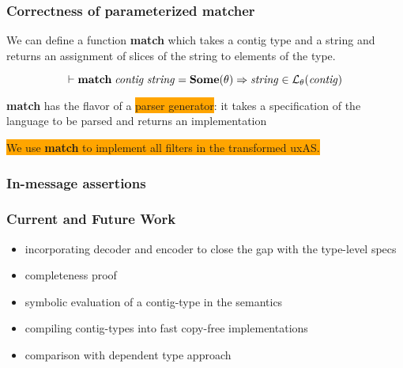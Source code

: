 \documentclass{beamer}
\newcommand{\imp}{\Rightarrow}
\newcommand{\kemph}[1]{\colorbox{orange}{#1}}
\newcommand{\konst}[1]{\ensuremath{\mbox{\bf{#1}}}}
\newcommand{\LangTheta}[1]{\ensuremath{{\mathcal L}_{\theta}({#1})}}
\begin{document}
\begin{frame}[fragile]\frametitle{Correctness of parameterized matcher}

We can define a function \textbf{match} which takes a contig type and
a string and returns an assignment of slices of the string to elements of the type.

\begin{theorem}[Soundness]
  \[
 \vdash \konst{match}\; \mathit{contig}\; \mathit{string} = \konst{Some}(\theta) \imp
   \mathit{string} \in \LangTheta{\mathit{contig}}
\]
\end{theorem}

\textbf{match} has the flavor of a \kemph{parser generator}: it takes a
specification of the language to be parsed and returns an implementation

\colorbox{orange}{We use \textbf{match} to implement all filters in
  the transformed uxAS.}

\end{frame}

\begin{frame}[fragile]\frametitle{In-message assertions}
\end{frame}


\begin{frame}\frametitle{Current and  Future Work}

\begin{itemize}
\item incorporating decoder and encoder to close the gap with the type-level specs
\item completeness proof
\item symbolic evaluation of a contig-type in the semantics
\item compiling contig-types into fast copy-free implementations
\item comparison with dependent type approach
\end{itemize}

\end{frame}
\end{document}
